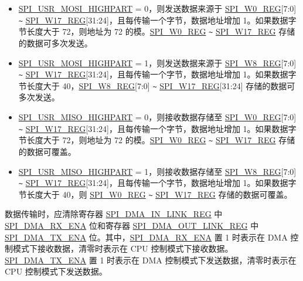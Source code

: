\documentclass[main\_\_CN.tex]{subfiles}
\begin{document}
\begin{itemize}
    \item \hyperref[fielddesc:SPIUSRMOSIHIGHPART]{SPI\_USR\_MOSI\_HIGHPART} = 0，则发送数据来源于 \hyperref[regdesc:SPIW0REG]{SPI\_W0\_REG}[7:0] \verb+~+ \hyperref[regdesc:SPIW17REG]{SPI\_W17\_REG}[31:24]，且每传输一个字节，数据地址增加 1。如果数据字节长度大于 72，则地址为 72 的模。\hyperref[regdesc:SPIW0REG]{SPI\_W0\_REG} \verb+~+ \hyperref[regdesc:SPIW17REG]{SPI\_W17\_REG} 存储的数据可多次发送。

    \item \hyperref[fielddesc:SPIUSRMOSIHIGHPART]{SPI\_USR\_MOSI\_HIGHPART} = 1，则发送数据来源于 \hyperref[regdesc:SPIW8REG]{SPI\_W8\_REG}[7:0] \verb+~+ \hyperref[regdesc:SPIW17REG]{SPI\_W17\_REG}[31:24]，且每传输一个字节，数据地址增加 1。如果数据字节长度大于 40，\hyperref[regdesc:SPIW8REG]{SPI\_W8\_REG}[7:0] \verb+~+ \hyperref[regdesc:SPIW17REG]{SPI\_W17\_REG}[31:24] 存储的数据可多次发送。

    \item \hyperref[fielddesc:SPIUSRMISOHIGHPART]{SPI\_USR\_MISO\_HIGHPART} = 0，则接收数据存储至 \hyperref[regdesc:SPIW0REG]{SPI\_W0\_REG}[7:0] \verb+~+ \hyperref[regdesc:SPIW17REG]{SPI\_W17\_REG}[31:24]，且每传输一个字节，数据地址增加 1。如果数据字节长度大于 72，则地址为 72 的模。\hyperref[regdesc:SPIW0REG]{SPI\_W0\_REG} \verb+~+ \hyperref[regdesc:SPIW17REG]{SPI\_W17\_REG} 存储的数据可覆盖。

    \item \hyperref[fielddesc:SPIUSRMISOHIGHPART]{SPI\_USR\_MISO\_HIGHPART} = 1，则接收数据存储至 \hyperref[regdesc:SPIW8REG]{SPI\_W8\_REG}[7:0] \verb+~+ \hyperref[regdesc:SPIW17REG]{SPI\_W17\_REG}[31:24]，且每传输一个字节，数据地址增加 1。如果数据字节长度大于 40，则 \hyperref[regdesc:SPIW0REG]{SPI\_W0\_REG} \verb+~+ \hyperref[regdesc:SPIW17REG]{SPI\_W17\_REG} 存储的数据可覆盖。

\end{itemize}

数据传输时，应清除寄存器 \hyperref[regdesc:SPIDMAINLINKREG]{SPI\_DMA\_IN\_LINK\_REG} 中 \hyperref[fielddesc:SPIDMARXENA]{SPI\_DMA\_RX\_ENA} 位和寄存器 \hyperref[regdesc:SPIDMAOUTLINKREG]{SPI\_DMA\_OUT\_LINK\_REG} 中 \hyperref[fielddesc:SPIDMATXENA]{SPI\_DMA\_TX\_ENA} 位。其中，\hyperref[fielddesc:SPIDMARXENA]{SPI\_DMA\_RX\_ENA} 置 1 时表示在 DMA 控制模式下接收数据，清零时表示在 CPU 控制模式下接收数据。\hyperref[fielddesc:SPIDMATXENA]{SPI\_DMA\_TX\_ENA} 置 1 时表示在 DMA 控制模式下发送数据，清零时表示在 CPU 控制模式下发送数据。
\end{document}
